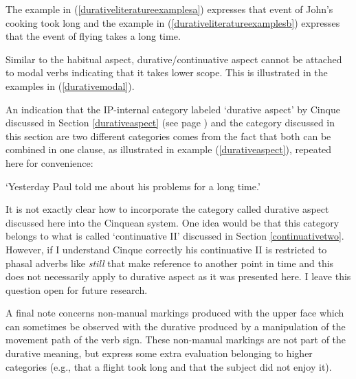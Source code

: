 \noindent The example in (\ref{durativeliteratureexamplesa}) expresses that event of John's cooking took long and the example in (\ref{durativeliteratureexamplesb}) expresses that the event of flying takes a long time.

Similar to the habitual aspect, durative/continuative aspect cannot be attached to modal verbs indicating that it takes lower scope. This is illustrated in the examples in (\ref{durativemodal}).


\begin{exe}
\ex\label{durativemodal}\begin{xlist}
\end{xlist}
\end{exe}

\noindent An indication that the IP-internal category labeled `durative aspect' by Cinque discussed in Section \ref{durativeaspect} (see page \pageref{durativeaspect}) and the category discussed in this section are two different categories comes from the fact that both can be combined in one clause, as illustrated in example (\ref{durativeaspect}), repeated here for convenience:


\begin{exe}
\glt `Yesterday Paul told me about his problems for a long time.' \label{ex:durativetwodgstwo}
\end{exe}

\noindent It is not exactly clear how to incorporate the category called durative aspect discussed here into the Cinquean system. One idea would be that this category belongs to what is called `continuative II' discussed in Section \ref{continuativetwo}. However, if I understand Cinque correctly his continuative II is restricted to phasal adverbs like \textit{still} that make reference to another point in time and this does not necessarily apply to durative aspect as it was presented here. I leave this question open for future research.

A final note concerns non-manual markings produced with the upper face which can sometimes be observed with the durative produced by a manipulation of the movement path of the verb sign. These non-manual markings are not part of the durative meaning, but express some extra evaluation belonging to higher categories (e.g., that a flight took long and that the subject did not enjoy it).

